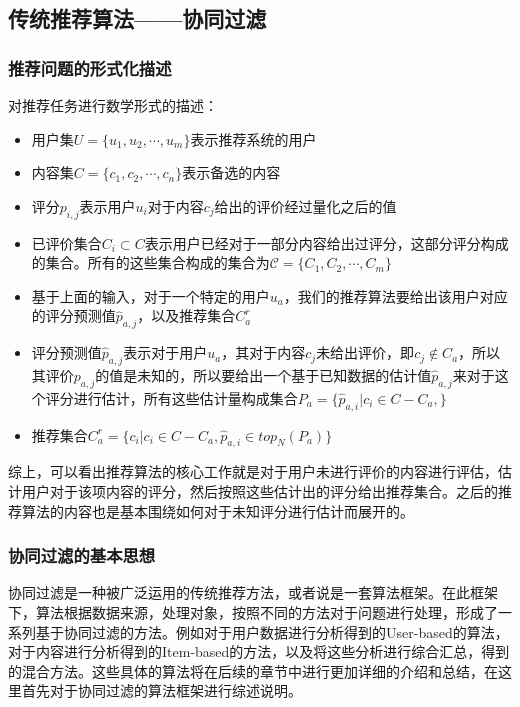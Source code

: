 \subsection{传统推荐算法——协同过滤}
\subsubsection{推荐问题的形式化描述}
对推荐任务进行数学形式的描述\cite{ItemCF}：
\begin{itemize}
    \item 用户集$U =\{u_1, u_2, \cdots, u_m\}$表示推荐系统的用户
    \item 内容集$C = \{c_1, c_2, \cdots, c_n\}$表示备选的内容
    \item 评分$p_{i, j}$表示用户$u_i$对于内容$c_j$给出的评价经过量化之后的值
    \item 已评价集合$C_i \subset   C$表示用户已经对于一部分内容给出过评分，这部分评分构成的集合。所有的这些集合构成的集合为$\mathcal{C} = \{C_1, C_2, \cdots, C_m\}$
    \item 基于上面的输入，对于一个特定的用户$u_a$，我们的推荐算法要给出该用户对应的评分预测值$\hat p_{a, j}$，以及推荐集合$C_{a}^r$
    \item 评分预测值$\hat p_{a, j}$表示对于用户$u_a$，其对于内容$c_j$未给出评价，即$c_j \not \in C_{a}$，所以其评价$p_{a, j}$的值是未知的，所以要给出一个基于已知数据的估计值$\hat p_{a, j} $来对于这个评分进行估计，所有这些估计量构成集合$P_a = 
    \{\hat p_{a, i}|c_i\in C - C_a,\}$
    \item 推荐集合$C_a^r = \{c_i|c_i\in C - C_a, \hat p_{a, i} \in top_N(P_a)\}$
\end{itemize}

综上，可以看出推荐算法的核心工作就是对于用户未进行评价的内容进行评估，估计用户对于该项内容的评分，然后按照这些估计出的评分给出推荐集合。之后的推荐算法的内容也是基本围绕如何对于未知评分进行估计而展开的。

\subsubsection{协同过滤的基本思想}
协同过滤是一种被广泛运用的传统推荐方法，或者说是一套算法框架。在此框架下，算法根据数据来源，处理对象，按照不同的方法对于问题进行处理，形成了一系列基于协同过滤的方法。例如对于用户数据进行分析得到的User-based的算法，对于内容进行分析得到的Item-based的方法，以及将这些分析进行综合汇总，得到的混合方法\cite{CFSurvey}。这些具体的算法将在后续的章节中进行更加详细的介绍和总结，在这里首先对于协同过滤的算法框架进行综述说明。

